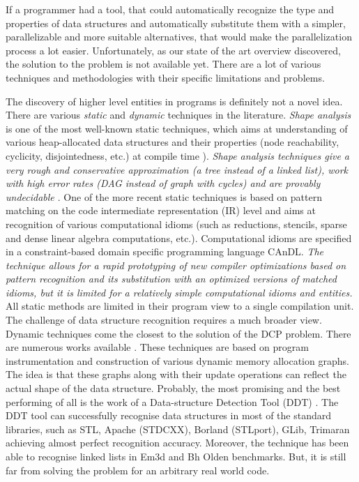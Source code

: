 \begin{description}[style=unboxed,leftmargin=0cm]
If a programmer had a tool, that could automatically recognize the type and properties of data structures and automatically substitute them with a simpler, parallelizable and more suitable alternatives, that would make the parallelization process a lot easier. Unfortunately, as our state of the art overview discovered, the solution to the problem is not available yet. There are a lot of various techniques and methodologies with their specific limitations and problems.
\item[\textit{Limitations of "The state of the art" work}] The discovery of higher level entities in programs is definitely not a novel idea. There are various \textit{static} and \textit{dynamic} techniques in the literature. \textit{Shape analysis} is one of the most well-known static techniques, which aims at understanding of various heap-allocated data structures and their properties (node reachability, cyclicity, disjointedness, etc.) at compile time \cite{Ghiya:1996:TDC:237721.237724}\cite{Sagiv:1999:PSA:292540.292552}\cite{Wilhelm:2000:SA:647476.760384}). \textit{Shape analysis techniques give a very rough and conservative approximation (a \textit{tree} instead of a \textit{linked list}), work with high error rates (\textit{DAG} instead of \textit{graph with cycles}) and are provably undecidable \cite{Muchnick:1998:ACD:286076}}. One of the more recent static techniques is based on pattern matching on the code intermediate representation (IR) level and aims at recognition of various computational idioms (such as reductions, stencils, sparse and dense linear algebra computations, etc.)\cite{Ginsbach:2017:DEG:3049832.3049862}\cite{Ginsbach:2018:CDS:3178372.3179515}\cite{Ginsbach:2018:AML:3296957.3173182}. Computational idioms are specified in a constraint-based domain specific programming language CAnDL. \textit{The technique allows for a rapid prototyping of new compiler optimizations based on pattern recognition and its substitution with an optimized versions of matched idioms, but it is limited for a relatively simple computational idioms and entities.} All static methods are limited in their program view to a single compilation unit. The challenge of data structure recognition requires a much broader view. Dynamic techniques come the closest to the solution of the DCP problem. There are numerous works available \cite{Haller:2016:SDS:2938006.2938029}\cite{Rupprecht:2017:DID:3155562.3155607}. These techniques are based on program instrumentation and construction of various dynamic memory allocation graphs. The idea is that these graphs along with their update operations can reflect the actual shape of the data structure. Probably, the most promising and the best performing of all is the work of a Data-structure Detection Tool (DDT) \cite{1669122}. The DDT tool can successfully recognise data structures in most of the standard libraries, such as STL, Apache (STDCXX), Borland (STLport), GLib, Trimaran achieving almost perfect recognition accuracy. Moreover, the technique has been able to recognise linked lists in Em3d and Bh Olden benchmarks. But, it is still far from solving the problem for an arbitrary real world code. 

\end{description}
